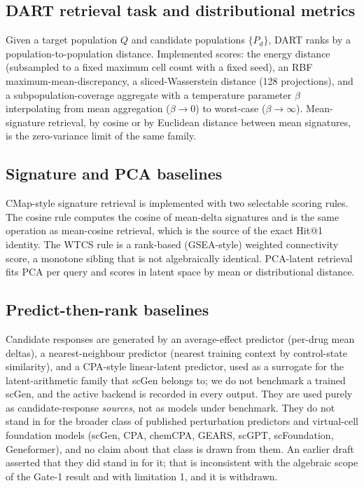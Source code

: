 \documentclass[11pt,letterpaper]{article}
\begin{document}
\subsection*{DART retrieval task and distributional metrics}

Given a target population $Q$ and candidate populations $\{P_d\}$, DART ranks by a
population-to-population distance. Implemented scores: the energy distance\cite{EnergyDistance} (subsampled to a fixed maximum cell
count with a fixed seed), an RBF maximum-mean-discrepancy\cite{MMD}, a
sliced-Wasserstein distance (128 projections)\cite{SlicedWasserstein}, and a
subpopulation-coverage aggregate with a temperature parameter $\beta$
interpolating from mean aggregation ($\beta \to 0$) to worst-case
($\beta \to \infty$). Mean-signature retrieval, by cosine or by Euclidean distance between
mean signatures, is the zero-variance limit of the same family.

\subsection*{Signature and PCA baselines}

CMap-style signature retrieval is implemented with two selectable scoring rules. The
cosine rule computes the cosine of mean-delta signatures and is the same operation as
mean-cosine retrieval, which is the source of the exact Hit@1 identity. The WTCS rule is a
rank-based (GSEA-style) weighted connectivity score, a monotone sibling that is not
algebraically identical. PCA-latent retrieval fits PCA per query and scores in latent space
by mean or distributional distance.

\subsection*{Predict-then-rank baselines}

Candidate responses are generated by an average-effect predictor (per-drug mean
deltas), a nearest-neighbour predictor (nearest training context by control-state
similarity), and a CPA-style linear-latent predictor, used as a surrogate for
the latent-arithmetic family that scGen\cite{ref4} belongs to; we do not benchmark a trained
scGen, and the active backend is recorded in every output. They are used purely as
candidate-response \emph{sources}, not as models under benchmark. They do not stand in
for the broader class of published perturbation predictors and virtual-cell foundation models
(scGen\cite{ref4}, CPA\cite{ref5}, chemCPA\cite{ref6}, GEARS\cite{ref10}, scGPT\cite{ref7},
scFoundation\cite{ref8}, Geneformer\cite{ref9}), and no claim about that class is drawn from
them. An earlier draft asserted that they did stand in for it; that is inconsistent with the
algebraic scope of the Gate-1 result and with limitation 1, and it is withdrawn.
\end{document}
